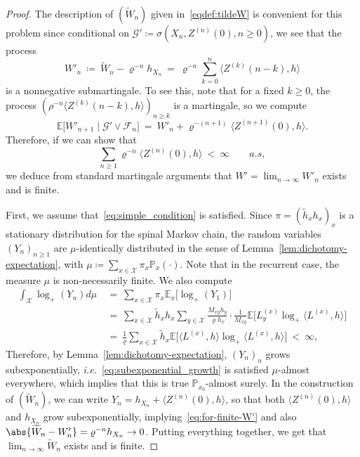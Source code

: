 \begin{refsegment}
\begin{proof}
  The description of $(\widetilde{W}_n)$ given in~\eqref{eqdef:tildeW} is convenient for this problem since conditional on $\mathcal{G}'\coloneqq\sigma(X_n,Z^{(n)}(0),n\geq 0)$, we see that the process
  \[
    W'_n \ \coloneqq\ \widetilde{W}_n - \varrho^{-n}h_{X_n}\ =\ \varrho^{-n}\sum_{k=0}^{n}\langle Z^{(k)}(n-k),h \rangle
  \]
  is a nonnegative submartingale.
  To see this, note that for a fixed $k\geq 0$, the process $(\rho^{-n}\langle Z^{(k)}(n-k),h \rangle)_{n\geq k}$ is a martingale, so we compute
  \[
    \mathbb{E}\big[W'_{n+1} \mid \mathcal{G}'\vee \mathcal{F}_n\big]\ =\ W'_n + \varrho^{-(n+1)}\langle Z^{(n+1)}(0),h\rangle.
  \]
  Therefore, if we can show that
  \begin{equation}\label{eq:for-finite-W'}
    \sum_{n\geq 1}\varrho^{-n}\langle Z^{(n)}(0),h\rangle \ <\ \infty \qquad a.s,
  \end{equation}
  we deduce from standard martingale arguments that $W'=\lim_{n\to \infty}W'_n$ exists and is finite.
  
  First, we assume that~\eqref{eq:simple_condition} is satisfied.
  Since $\pi=(\tilde{h}_xh_x)_x$ is a stationary distribution for the
  spinal Markov chain, the random variables $(Y_n)_{n\geq 1}$
    are $\mu$-identically distributed in the sense of
    Lemma~\ref{lem:dichotomy-expectation}, with $\mu \coloneqq \sum_{x\in \mathcal{X}} \pi_x \mathbb{P}_x(\cdot)$. Note that in the recurrent case, the measure $\mu$ is non-necessarily finite.
  We also compute
  \begin{align*}
   \int_{\mathcal{X}} \log_+(Y_n) d\mu\ & =\ \sum_{x\in \mathcal{X}} \pi_x \mathbb{E}_x\big[\log_+(Y_1)\big]\\
    &=\ \sum_{x\in \mathcal{X}}\tilde{h}_x h_x \sum_{y\in \mathcal{X}} \frac{M_{xy}h_y}{\varrho h_x} \cdot \frac{1}{M_{xy}}\mathbb{E}\Big[L^{(x)}_y\log_+\langle L^{(x)},h\rangle\Big]\\
    &=\  \frac{1}{\varrho}\sum_{x\in \mathcal{X}}\tilde{h}_x \mathbb{E}\Big[\langle L^{(x)},h\rangle\log_+\langle L^{(x)},h\rangle\Big]\ <\ \infty,
  \end{align*}
Therefore, by Lemma~\ref{lem:dichotomy-expectation}, $(Y_n)_n$
  grows subexponentially, \textit{i.e.}~\eqref{eq:subexponential_growth} is satisfied $\mu$-almost everywhere, which implies that this is true $\mathbb{P}_{x_0}$-almost surely.
  In the construction of $(\widetilde{W}_n)$, we can write $Y_n = h_{X_n}+\langle Z^{(n)}(0),h\rangle$, so that both $\langle Z^{(n)}(0),h\rangle$ and $h_{X_n}$ grow subexponentially, implying~\eqref{eq:for-finite-W'} and also $\abs{\widetilde{W}_n - W'_n} = \varrho^{-n}h_{X_n}\to 0$.
  Putting everything together, we get that $\lim_{n\to \infty}\widetilde{W}_n$ exists and is finite.
  

\end{proof}
\end{refsegment}
